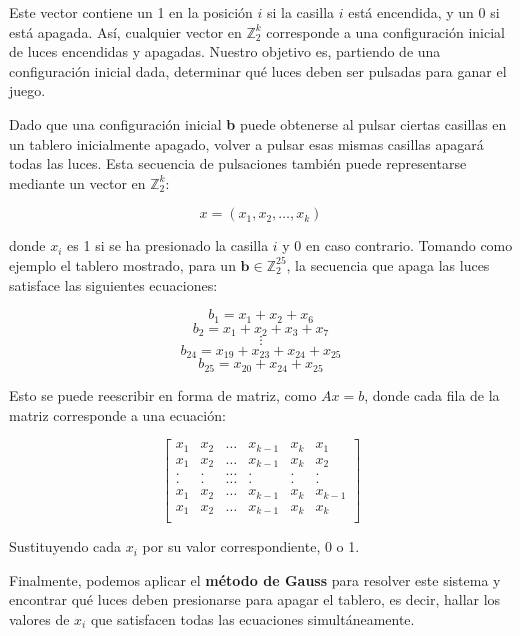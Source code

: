 \documentclass{article}
\begin{document}
    Este vector contiene un 1 en la posición $i$ si la casilla $i$ está encendida, y un 0 si está apagada. Así, cualquier vector en $\mathbb{Z}^k_2$ corresponde a una configuración inicial de luces encendidas y apagadas. Nuestro objetivo es, partiendo de una configuración inicial dada, determinar qué luces deben ser pulsadas para ganar el juego.
    
    Dado que una configuración inicial \textbf{b} puede obtenerse al pulsar ciertas casillas en un tablero inicialmente apagado, volver a pulsar esas mismas casillas apagará todas las luces. Esta secuencia de pulsaciones también puede representarse mediante un vector en $\mathbb{Z}^k_2$:
    
    \[
    x = (x_1, x_2, \dots, x_k)
    \]
    
    donde $x_i$ es 1 si se ha presionado la casilla $i$ y 0 en caso contrario. Tomando como ejemplo el tablero mostrado, para un $\textbf{b} \in \mathbb{Z}^{25}_2$, la secuencia que apaga las luces satisface las siguientes ecuaciones:
    
    \[
    b_1 = x_1 + x_2 + x_6
    \]
    \[
    b_2 = x_1 + x_2 + x_3 + x_7
    \]
    \[
    \vdots
    \]
    \[
    b_{24} = x_{19} + x_{23} + x_{24} + x_{25}
    \]
    \[
    b_{25} = x_{20} + x_{24} + x_{25}
    \]
    
    Esto se puede reescribir en forma de matriz, como $Ax = b$, donde cada fila de la matriz corresponde a una ecuación:
    
    \[
    \left[
    \begin{array}{ccccc|c}
        x_1 & x_2 & \dots & x_{k-1} & x_k & x_1 \\
        x_1 & x_2 & \dots & x_{k-1} & x_k & x_2 \\
        .   & .   & \dots & .       & .   & .   \\
        .   & .   & \dots & .       & .   & .   \\
        x_1 & x_2 & \dots & x_{k-1} & x_k & x_{k-1} \\
        x_1 & x_2 & \dots & x_{k-1} & x_k & x_k \\
    \end{array}
    \right]
    \]
    
    Sustituyendo cada $x_i$ por su valor correspondiente, 0 o 1.
    
    Finalmente, podemos aplicar el \textbf{método de Gauss} para resolver este sistema y encontrar qué luces deben presionarse para apagar el tablero, es decir, hallar los valores de $x_i$ que satisfacen todas las ecuaciones simultáneamente.
\end{document}
